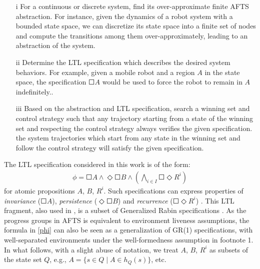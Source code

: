 \begin{itemize}
	\item[i] For a continuous or discrete system, find its over-approximate {\color{purple} finite} AFTS abstraction. For instance, given the dynamics of a robot system with {\color{purple} a bounded} state space, we can discretize its state space into {\color{purple} a finite set of nodes} and compute the transitions among them over-approximately,  {\color{purple} leading to an abstraction of the system}.
	\item[ii] Determine the LTL specification which describes the desired system behaviors. For example, given a mobile robot and a region $ A $ in the state space, the specification $ \Square A $ {\color{purple} would be used to force the robot to remain in $A$ indefinitely.}. 
	\item[iii] Based on the abstraction and LTL specification, search {\color{purple} a} winning set and control strategy such that {\color{purple} any trajectory starting from a state of the winning set and respecting the control strategy always verifies the given specification.} the system trajectories which start from any state in the winning set and follow the control strategy will satisfy the given specification.
\end{itemize}
\fi


The LTL specification considered in this work is of the form:
\begin{align}
\phi = \Square A \wedge \Diamond \Square B \wedge \left( \bigwedge_{i\in I} \Square \Diamond R^i\right)\label{phi}
\end{align}
for atomic propositions $A$, $B$, $R^i$. Such specifications can express properties of \emph{invariance} ($\Square A$), \emph{persistence} ($\Diamond \Square B$) and \emph{recurrence} ($\Square \Diamond R^i$)
. This LTL fragment, also used in \cite{wolff2013efficient,Nilsson2017}, is a subset of Generalized Rabin specifications \cite{ehlers2017supervisory}. As the progress groups in AFTS is equivalent to environment liveness assumptions, the formula in \eqref{phi} can also be seen as a generalization of GR(1) specifications, with well-separated environments \cite{klein2010revisiting, maoz2016well,schmuckrelation} under the well-formedness assumption in footnote 1. In what follows, with a slight abuse of notation, we treat $A$, $B$, $R^i$ as subsets of the state set $Q$, e.g., $A = \{ s\in Q \mid A\in h_Q(s)\}$, etc.

